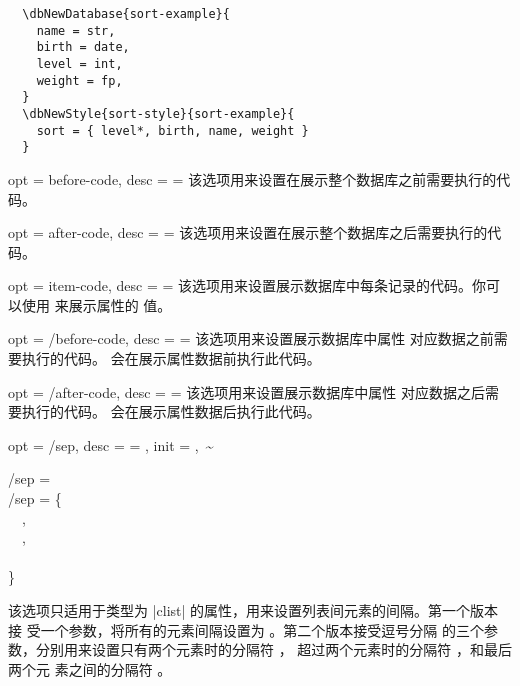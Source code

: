 \documentclass[full]{l3doc}
\begin{document}
\begin{documentation}
\begin{verbatim}
  \dbNewDatabase{sort-example}{
    name = str,
    birth = date,
    level = int,
    weight = fp,
  }
  \dbNewStyle{sort-style}{sort-example}{
    sort = { level*, birth, name, weight }
  }
\end{verbatim}

\begin{option}{
  opt = before-code,
  desc = {= }
}
  该选项用来设置在展示整个数据库之前需要执行的代码。
\end{option}

\begin{option}{
  opt = after-code,
  desc = {= }
}
  该选项用来设置在展示整个数据库之后需要执行的代码。
\end{option}

\begin{option}{
  opt = item-code,
  desc = {= }
}
  该选项用来设置展示数据库中每条记录的代码。你可以使用  来展示属性的
  值。
\end{option}

\begin{option}{
  opt = {/before-code},
  desc = {= }
}
  该选项用来设置展示数据库中属性  对应数据之前需要执行的代码。
   会在展示属性数据前执行此代码。
\end{option}

\begin{option}{
  opt = {/after-code},
  desc = {= }
}
  该选项用来设置展示数据库中属性  对应数据之后需要执行的代码。
   会在展示属性数据后执行此代码。
\end{option}

\begin{option}{
  opt = {/sep},
  desc = {= },
  init = {,~\~}
}
\begin{Syntax}
  /sep =  \\
  /sep = \{ \\
  ~~, \\
  ~~, \\
  ~~ \\
  \}
\end{Syntax}

  该选项只适用于类型为 |clist| 的属性，用来设置列表间元素的间隔。第一个版本接
  受一个参数，将所有的元素间隔设置为 。第二个版本接受逗号分隔
  的三个参数，分别用来设置只有两个元素时的分隔符 ，
  超过两个元素时的分隔符 ，和最后两个元
  素之间的分隔符 。


\end{option}
\end{documentation}
\end{document}
